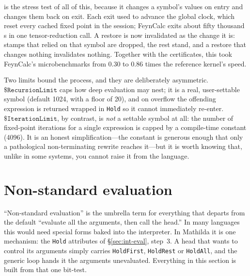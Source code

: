  is the stress test of all of this, because it changes a symbol's values on
entry and changes them back on exit. Each exit used to advance the global clock,
which reset every cached fixed point in the session; FeynCalc exits about fifty
thousand s in one tensor-reduction call. A restore is now invalidated as the
change it is: stamps that relied on that symbol are dropped, the rest stand, and a
restore that changes nothing invalidates nothing. Together with the certificates,
this took FeynCalc's microbenchmarks from 0.30 to 0.86 times the reference kernel's
speed.

Two limits bound the process, and they are deliberately asymmetric.
\(\mathtt{\$RecursionLimit}\) caps how deep evaluation may nest; it is a real,
user-settable symbol (default 1024, with a floor of 20), and on overflow the offending
expression is returned wrapped in \texttt{Hold} so it cannot immediately re-enter.
\(\mathtt{\$IterationLimit}\), by contrast, is \emph{not} a settable symbol at all: the
number of fixed-point iterations for a single expression is capped by a compile-time
constant (4096). It is an honest simplification---the constant is generous enough that
only a pathological non-terminating rewrite reaches it---but it is worth knowing that,
unlike in some systems, you cannot raise it from the language.

\section{Non-standard evaluation}
\label{sec:int-nonstd}

``Non-standard evaluation'' is the umbrella term for everything that departs from the
default ``evaluate all the arguments, then call the head.'' In many languages this
would need special forms baked into the interpreter. In Mathilda it is one mechanism:
the \texttt{Hold} attributes of \S\ref{sec:int-eval}, step~3. A head that wants to
control its arguments simply carries \texttt{HoldFirst}, \texttt{HoldRest} or
\texttt{HoldAll}, and the generic loop hands it the arguments unevaluated. Everything
in this section is built from that one bit-test.

